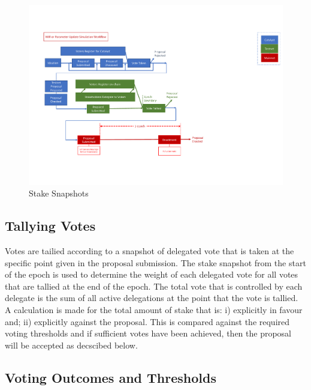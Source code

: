 \begin{figure}
  \includegraphics[trim=0 90 0 80,clip,width=\textwidth]{Stake-Snapshots}
  \caption{Stake Snapshots}
  \label{fig:stake-snapshots}
\end{figure}



\subsection{Tallying Votes}

Votes are tailied according to a snapshot of delegated vote that is taken at the specific point given in the proposal submission.  The stake snapshot from the start of the epoch is used to determine
the weight of each delegated vote for all votes that are tallied at the end of the epoch.  The total vote that is controlled by each delegate is the sum of all active delegations at the point that
the vote is tallied.  A calculation is made for the total amount of stake that is: i) explicitly in favour and; ii) explicitly against the proposal.  This is compared against the required voting thresholds and
if sufficient votes have been achieved, then the proposal will be accepted as decscibed below.

\subsection{Voting Outcomes and Thresholds}

